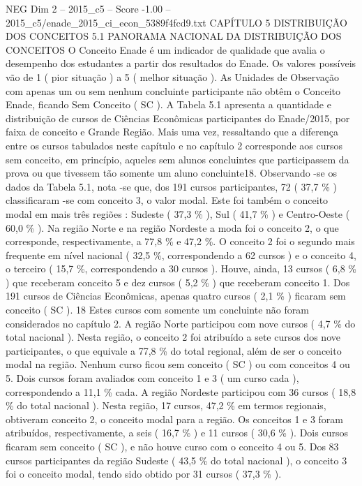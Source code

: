 \begin{textsample}{NEG Dim 2 – 2015\_c5 – Score -1.00 – 2015\_c5/enade\_2015\_ci\_econ\_5389f4fcd9.txt}  \label{ex:f2_neg_154}
CAPÍTULO 5 DISTRIBUIÇÃO DOS CONCEITOS 5.1 PANORAMA NACIONAL DA DISTRIBUIÇÃO DOS CONCEITOS O Conceito Enade é um indicador de qualidade que avalia o desempenho dos estudantes a partir dos resultados do Enade.
Os valores possíveis vão de 1 ( pior situação ) a 5 ( melhor situação ).
As Unidades de Observação com apenas um ou sem nenhum concluinte participante não obtêm o Conceito Enade, ficando Sem Conceito ( SC ).
A Tabela 5.1 apresenta a quantidade e distribuição de cursos de Ciências Econômicas participantes do Enade/2015, por faixa de conceito e Grande Região.
Mais uma vez, ressaltando que a diferença entre os cursos tabulados neste capítulo e no capítulo 2 corresponde aos cursos sem conceito, em princípio, aqueles sem alunos concluintes que participassem da prova ou que tivessem tão somente um aluno concluinte18.
Observando -se os dados da Tabela 5.1, nota -se que, dos 191 cursos participantes, 72 ( 37,7 \% ) classificaram -se com conceito 3, o valor modal.
Este foi também o conceito modal em mais três regiões : Sudeste ( 37,3 \% ), Sul ( 41,7 \% ) e Centro-Oeste ( 60,0 \% ).
Na região Norte e na região Nordeste a moda foi o conceito 2, o que corresponde, respectivamente, a 77,8 \% e 47,2 \%.
O conceito 2 foi o segundo mais frequente em nível nacional ( 32,5 \%, correspondendo a 62 cursos ) e o conceito 4, o terceiro ( 15,7 \%, correspondendo a 30 cursos ).
Houve, ainda, 13 cursos ( 6,8 \% ) que receberam conceito 5 e dez cursos ( 5,2 \% ) que receberam conceito 1.
Dos 191 cursos de Ciências Econômicas, apenas quatro cursos ( 2,1 \% ) ficaram sem conceito ( SC ). 18 Estes cursos com somente um concluinte não foram considerados no capítulo 2.
A região Norte participou com nove cursos ( 4,7 \% do total nacional ).
Nesta região, o conceito 2 foi atribuído a sete cursos dos nove participantes, o que equivale a 77,8 \% do total regional, além de ser o conceito modal na região.
Nenhum curso ficou sem conceito ( SC ) ou com conceitos 4 ou 5.
Dois cursos foram avaliados com conceito 1 e 3 ( um curso cada ), correspondendo a 11,1 \% cada.
A região Nordeste participou com 36 cursos ( 18,8 \% do total nacional ).
Nesta região, 17 cursos, 47,2 \% em termos regionais, obtiveram conceito 2, o conceito modal para a região.
Os conceitos 1 e 3 foram atribuídos, respectivamente, a seis ( 16,7 \% ) e 11 cursos ( 30,6 \% ).
Dois cursos ficaram sem conceito ( SC ), e não houve curso com o conceito 4 ou 5.
Dos 83 cursos participantes da região Sudeste ( 43,5 \% do total nacional ), o conceito 3 foi o conceito modal, tendo sido obtido por 31 cursos ( 37,3 \% ).

\end{textsample}
